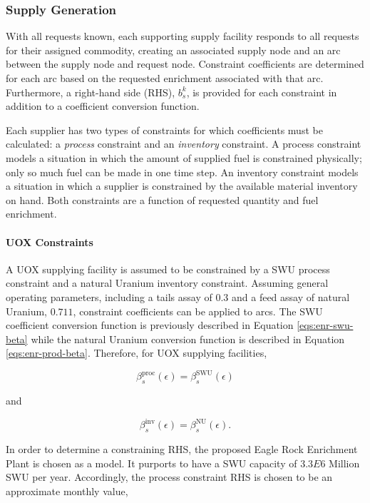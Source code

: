 \subsubsection{Supply Generation}\label{method:setup:front:subgen}

With all requests known, each supporting supply facility responds to all
requests for their assigned commodity, creating an associated supply node and an
arc between the supply node and request node. Constraint coefficients are
determined for each arc based on the requested enrichment associated with that
arc. Furthermore, a right-hand side (RHS), $b^k_s$, is provided for each
constraint in addition to a coefficient conversion function.

Each supplier has two types of constraints for which coefficients must be
calculated: a \textit{process} constraint and an \textit{inventory} constraint. A
process constraint models a situation in which the amount of supplied fuel is
constrained physically; only so much fuel can be made in one time step. An
inventory constraint models a situation in which a supplier is constrained by
the available material inventory on hand. Both constraints are a function of
requested quantity and fuel enrichment.

\paragraph{UOX Constraints}

A UOX supplying facility is assumed to be constrained by a SWU process
constraint and a natural Uranium inventory constraint. Assuming general
operating parameters, including a tails assay of $0.3$ and a feed assay of
natural Uranium, $0.711$, constraint coefficients can be applied to arcs. The SWU
coefficient conversion function is previously described in Equation
\ref{eqs:enr-swu-beta} while the natural Uranium conversion function is
described in Equation \ref{eqs:enr-prod-beta}. Therefore, for UOX supplying
facilities,

\begin{equation}
\beta^{\text{proc}}_s(\epsilon) = \beta^{\text{SWU}}_s(\epsilon) 
\end{equation}

and

\begin{equation}
\beta^{\text{inv}}_s(\epsilon) = \beta^{\text{NU}}_s(\epsilon). 
\end{equation}

In order to determine a constraining RHS, the proposed Eagle Rock Enrichment
Plant is chosen as a model. It purports to have a SWU capacity of $3.3E6$
Million SWU per year. Accordingly, the process constraint RHS is chosen to be an
approximate monthly value,

